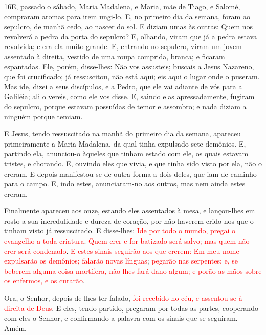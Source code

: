 \medskip

\lettrine{16} E, passado o sábado, Maria Madalena, e Maria,
mãe de Tiago, e Salomé, compraram aromas para irem ungi-lo. E,
no primeiro dia da semana, foram ao sepulcro, de manhã cedo, ao
nascer do sol. E diziam umas às outras: Quem nos revolverá a
pedra da porta do sepulcro? E, olhando, viram que já a pedra
estava revolvida; e era ela muito grande. E, entrando no
sepulcro, viram um jovem assentado à direita, vestido de uma roupa
comprida, branca; e ficaram espantadas. Ele, porém, disse-lhes:
Não vos assusteis; buscais a Jesus Nazareno, que foi crucificado; já
ressuscitou, não está aqui; eis aqui o lugar onde o puseram. Mas
ide, dizei a seus discípulos, e a Pedro, que ele vai adiante de vós
para a Galiléia; ali o vereis, como ele vos disse. E, saindo
elas apressadamente, fugiram do sepulcro, porque estavam possuídas
de temor e assombro; e nada diziam a ninguém porque temiam.

E Jesus, tendo ressuscitado na manhã do primeiro dia da semana,
apareceu primeiramente a Maria Madalena, da qual tinha expulsado
sete demônios. E, partindo ela, anunciou-o àqueles que tinham
estado com ele, os quais estavam tristes, e chorando. E,
ouvindo eles que vivia, e que tinha sido visto por ela, não o
creram. E depois manifestou-se de outra forma a dois deles,
que iam de caminho para o campo. E, indo estes, anunciaram-no
aos outros, mas nem ainda estes creram.

Finalmente apareceu aos onze, estando eles assentados à mesa, e
lan\-çou-lhes em rosto a sua incredulidade e dureza de coração, por
não haverem crido nos que o tinham visto já ressuscitado. E
disse-lhes: \textcolor{red}{Ide por todo o mundo, pregai o evangelho a toda
criatura}. \textcolor{red}{Quem crer e for batizado será salvo; mas quem não
crer será condenado}. \textcolor{red}{E estes sinais seguirão aos que crerem:
Em meu nome expulsarão os demônios; falarão novas línguas};
\textcolor{red}{pegarão nas serpentes; e, se beberem alguma coisa mortífera,
não lhes fará dano algum; e porão as mãos sobre os enfermos, e os
curarão}.

Ora, o Senhor, depois de lhes ter falado, \textcolor{red}{foi recebido no céu, e
assentou-se à direita de Deus}. E eles, tendo partido,
pregaram por todas as partes, cooperando com eles o Senhor, e
confirmando a palavra com os sinais que se seguiram. Amém.

